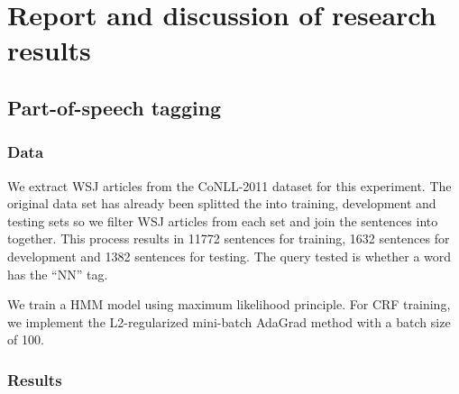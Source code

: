 \chapter{Report and discussion of research results}

\section{Part-of-speech tagging}

\subsection{Data}

We extract WSJ articles from the CoNLL-2011 dataset for this experiment. The original data set has already been splitted the into training, development and testing sets so we filter WSJ articles from each set and join the sentences into together. This process results in 11772 sentences for training, 1632 sentences for development and 1382 sentences for testing. The query tested is whether a word has the ``NN'' tag.

We train a HMM model using maximum likelihood principle. For CRF training, we implement the L2-regularized mini-batch AdaGrad method with a batch size of 100.   

\subsection{Results}

